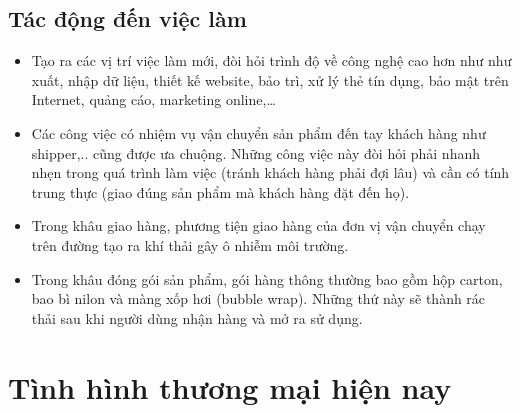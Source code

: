 \documentclass[12pt]{article}
\begin{document}
\subsection{Tác động đến việc làm}
\begin{itemize}
    \item Tạo ra các vị trí việc làm mới, đòi hỏi trình độ về công nghệ cao hơn như như xuất, nhập dữ liệu, thiết kế website, bảo trì, xử lý thẻ tín dụng, bảo mật trên Internet, quảng cáo, marketing online,…
    \item Các công việc có nhiệm vụ vận chuyển sản phẩm đến tay khách hàng như shipper,.. cũng được ưa chuộng. Những công việc này đòi hỏi phải nhanh nhẹn trong quá trình làm việc (tránh khách hàng phải đợi lâu) và cần có tính trung thực (giao đúng sản phẩm mà khách hàng đặt đến họ). 
\end{itemize}

\begin{itemize}
    \item Trong khâu giao hàng, phương tiện giao hàng của đơn vị vận chuyển chạy trên đường tạo ra khí thải gây ô nhiễm môi trường.
    \item Trong khâu đóng gói sản phẩm, gói hàng thông thường bao gồm hộp carton, bao bì nilon và màng xốp hơi (bubble wrap). Những thứ này sẽ thành rác thải sau khi người dùng nhận hàng và mở ra sử dụng.
\end{itemize}

\section{Tình hình thương mại hiện nay}
\end{document}
